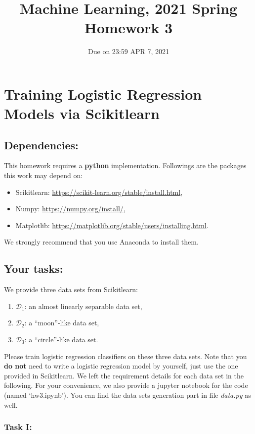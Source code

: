 \documentclass[10pt]{article}
\begin{document}
	
\title{	Machine Learning, 2021 Spring\\Homework 3}
\date{Due on 23:59 APR 7, 2021}
\maketitle


\section{Training Logistic Regression Models via Scikitlearn}
\subsection{Dependencies:}
This homework requires a \textbf{python} implementation. Followings are the packages this work may depend on:
\begin{itemize}
	\item Scikitlearn: \url{https://scikit-learn.org/stable/install.html},
	\item Numpy: \url{https://numpy.org/install/},
	\item Matplotlib: \url{https://matplotlib.org/stable/users/installing.html}.
\end{itemize}
We strongly recommend that you use Anaconda to install them.

\subsection{Your tasks:}
We provide three data sets from Scikitlearn: 
\begin{enumerate}
	\item $\mathcal{D}_1$: an almost linearly separable data set,
	\item $\mathcal{D}_2$: a ``moon''-like data set,
	\item $\mathcal{D}_3$: a ``circle''-like data set. 
\end{enumerate}
Please train logistic regression classifiers on these three data sets. Note that you \textbf{do not} need to write a logistic regression model by yourself, just use the one provided in Scikitlearn.
We left the requirement details for each data set in the following. For your convenience, we also provide a jupyter notebook for the code (named `hw3.ipynb'). You can find the data sets generation part in file \emph{data.py} as well.

\subsubsection*{Task I:}\label{s.T1}
\end{document}
